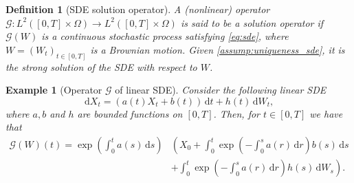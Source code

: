 \documentclass[12pt]{article}
\newtheorem{definition}[theorem]{Definition}
\newtheorem{example}[theorem]{Example}
\theoremstyle{remark}
\theoremstyle{plain}
\numberwithin{equation}{section}
\newcommand{\dd}{\ensuremath{\,\mathrm d}}
\begin{document}
\begin{definition}[SDE solution operator]\label{def:sde_sol_operator}
    A (nonlinear) operator $\mathcal G : L^2([0,T] \times \Omega) \to L^2([0,T] \times \Omega)$ is said to be a \emph{solution operator} if $\mathcal G(W)$ is a continuous stochastic process satisfying \cref{eq:sde}, where $W = (W_t)_{t \in [0,T]}$ is a Brownian motion.
    Given \cref{assump:uniqueness_sde}, it is the strong solution of the SDE with respect to $W$.
\end{definition}

\begin{example}[Operator $\mathcal G$ of linear SDE]
    Consider the following \emph{linear SDE}
    \begin{equation*}
        \dd X_t = \left(a(t)X_t + b(t)\right)\dd t + h(t)\dd W_t,
    \end{equation*}
    where $a,b$ and $h$ are bounded functions on $[0,T]$.
    Then, for $t \in [0,T]$ we have that
    \begin{align*}
        \mathcal G(W)(t) = \exp\left(\int_0^t a(s)\dd s\right) & \left( X_0 + \int_0^t\exp\left(-\int_0^s a(r)\dd r\right)b(s)\dd s \right. \\
        &\left. + \int_0^t\exp\left(-\int_0^s a(r)\dd r\right)h(s)\dd W_s\right).
    \end{align*}
\end{example}
\end{document}
